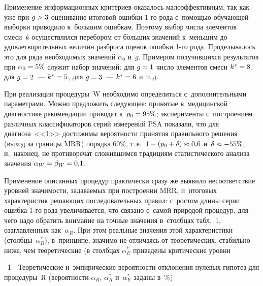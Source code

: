 \begin{multicols}{2}
     Применение информационных критериев оказалось малоэффективным, 
так как уже при $g\hm>3$ оценивание итоговой ошибки 1-го рода с~по\-мощью 
обучающей выборки приводило к~большим ошибкам. Поэтому выбор числа 
элементов смеси~$k$ осуществлялся перебором от б$\acute{\mbox{о}}$льших 
значений к~меньшим до удовлетворительных величин разброса оценок ошибки 
1-го рода. Проделывалось это для ряда необходимых значений $\alpha_0$ и~$g$. 
Примером получившихся результатов при $\alpha_0\hm=5\%$ служит набор 
значений: для $g\hm=1$ число элементов смеси $k^*\hm=8$, для $g\hm=2$~--- 
$k^*\hm=5$, для $g\hm=3$~--- $k^*\hm=6$ и~т.\,д.
     
     При реализации процедуры~W необходимо определиться 
с~дополнительными параметрами. Можно предложить следующее: принятые 
в~медицинской диагностике рекомендации приводят к~$p_0\hm=95\%$; 
эксперименты с~построением различных классификаторов серий измерений 
PSA показали, что для диагноза~<<1>> достижимы вероятности принятия 
правильного решения (выход за границы MRR) порядка 60\%, т.\,е.\ $1\hm-
(p_0\hm+\delta)\hm\approx 0{,}6$  
и~$\delta\hm\approx -55\%$, и,~наконец, не противоречат сложившимся 
традициям статистического анализа значения 
$\alpha_W\hm=\beta_W\hm=0{,}1$.
     


Применение описанных процедур практически сразу же выявило 
несоответствие уровней значимости, задаваемых при построении MRR, 
и~итоговых характеристик решающих последовательных правил: с~ростом 
длины серии ошибка 1-го рода увеличивается, что связано с~самой природой 
процедур, для чего надо обратить внимание на точные значения в~столбцах 
табл.~1, озаглавленных как~$\alpha_R$. При этом реальные значения этой 
характеристики (столбцы~$\alpha_R^*$), в~принципе, значимо не 
отличаясь  от 
теоретических, стабильно ниже, чем теоретические (в столбцах $\alpha_E^*$ 
приведены критические уровни\linebreak\vspace*{-12pt}

\columnbreak

{ %

\noindent
{{\tablename~1}\ \ \small{Теоретические и~эмпирические вероятности 
отклонения нулевых гипотез для процедуры~R (вероятности $\alpha_R$, 
$\alpha_R^*$ и~$\alpha_E^*$ заданы в~\%)}}


}
\end{multicols}
